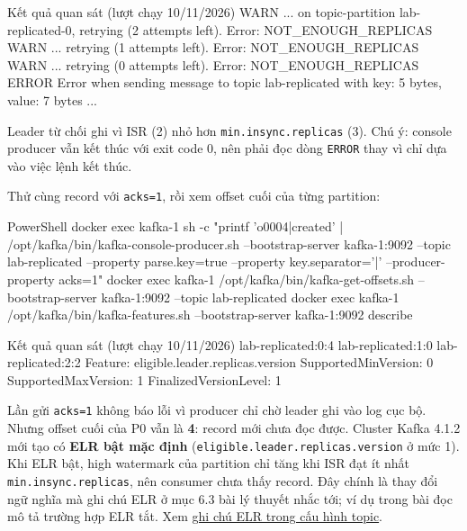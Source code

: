 \begin{aivnCodeOutput}{Kết quả quan sát (lượt chạy 10/11/2026)}
WARN ... on topic-partition lab-replicated-0, retrying (2 attempts left). Error: NOT_ENOUGH_REPLICAS
WARN ... retrying (1 attempts left). Error: NOT_ENOUGH_REPLICAS
WARN ... retrying (0 attempts left). Error: NOT_ENOUGH_REPLICAS
ERROR Error when sending message to topic lab-replicated with key: 5 bytes, value: 7 bytes ...
\end{aivnCodeOutput}

Leader từ chối ghi vì ISR (2) nhỏ hơn \texttt{min.\allowbreak{}insync.\allowbreak{}replicas} (3). Chú ý: console producer vẫn kết thúc với exit code 0, nên phải đọc dòng \texttt{ERROR} thay vì chỉ dựa vào việc lệnh kết thúc.


Thử cùng record với \texttt{acks=\allowbreak{}1}, rồi xem offset cuối của từng partition:


\begin{aivncodebox}[language={}]{PowerShell}
docker exec kafka-1 sh -c "printf 'o0004|created\n' | /opt/kafka/bin/kafka-console-producer.sh --bootstrap-server kafka-1:9092 --topic lab-replicated --property parse.key=true --property key.separator='|' --producer-property acks=1"
docker exec kafka-1 /opt/kafka/bin/kafka-get-offsets.sh --bootstrap-server kafka-1:9092 --topic lab-replicated
docker exec kafka-1 /opt/kafka/bin/kafka-features.sh --bootstrap-server kafka-1:9092 describe
\end{aivncodebox}

\begin{aivnCodeOutput}{Kết quả quan sát (lượt chạy 10/11/2026)}
lab-replicated:0:4
lab-replicated:1:0
lab-replicated:2:2
Feature: eligible.leader.replicas.version  SupportedMinVersion: 0  SupportedMaxVersion: 1  FinalizedVersionLevel: 1
\end{aivnCodeOutput}

Lần gửi \texttt{acks=\allowbreak{}1} không báo lỗi vì producer chỉ chờ leader ghi vào log cục bộ. Nhưng offset cuối của P0 vẫn là \textbf{4}: record mới chưa đọc được. Cluster Kafka 4.1.2 mới tạo có \textbf{ELR bật mặc định} (\texttt{eligible.\allowbreak{}leader.\allowbreak{}replicas.\allowbreak{}version} ở mức 1). Khi ELR bật, high watermark của partition chỉ tăng khi ISR đạt ít nhất \texttt{min.\allowbreak{}insync.\allowbreak{}replicas}, nên consumer chưa thấy record. Đây chính là thay đổi ngữ nghĩa mà ghi chú ELR ở mục 6.3 bài lý thuyết nhắc tới; ví dụ trong bài đọc mô tả trường hợp ELR tắt. Xem \href{https://kafka.apache.org/41/configuration/topic-configs/}{ghi chú ELR trong cấu hình topic}.


